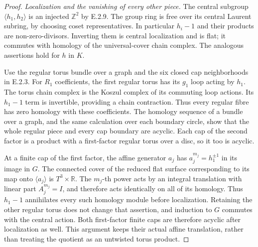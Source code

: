 \begin{proof}
\emph{Localization and the vanishing of every other piece.}
The central subgroup $\langle h_1,h_2\rangle$ is an injected
$\mathbb Z^2$ by E.2.9. The group ring is free over its central
Laurent subring, by choosing coset representatives. In particular
$h_i-1$ and their products are non-zero-divisors. Inverting them
is central localization and is flat; it commutes with homology
of the universal-cover chain complex. The analogous assertions
hold for $h$ in $K$.

Use the regular torus bundle over a graph and the six closed
cap neighborhoods in E.2.3. For $R_1$ coefficients, the first
regular torus has its $g_1$ loop acting by $h_1$. The torus
chain complex is the Koszul complex of its commuting loop
actions. Its $h_1-1$ term is invertible, providing a chain
contraction. Thus every regular fibre has zero homology with
these coefficients. The homology sequence of a bundle over
a graph, and the same calculation over each boundary circle,
show that the whole regular piece and every cap boundary are
acyclic. Each cap of the second factor is a product with a
first-factor regular torus over a disc, so it too is acyclic.

At a finite cap of the first factor, the affine generator
$a_j$ has $a_j^{m_j}=h_1^{\pm1}$ in its image in $G$.
The connected cover of the reduced flat surface corresponding
to its map onto $\langle a_j\rangle$ is $T^3\times\mathbb R$.
The $m_j$-th power acts by an integral translation with linear
part $A_j^{m_j}=I$, and therefore acts identically on all of
its homology. Thus $h_1-1$ annihilates every such homology
module before localization. Retaining the other regular torus
does not change that assertion, and induction to $G$ commutes
with the central action. Both first-factor finite caps are
therefore acyclic after localization as well. This argument
keeps their actual affine translation, rather than treating
the quotient as an untwisted torus product.


\end{proof}
